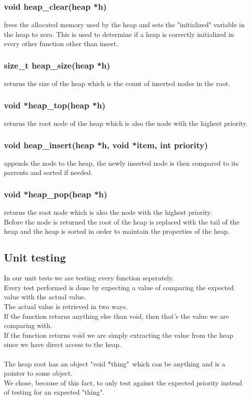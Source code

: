 \documentclass[a4paper,12pt,danish]{report}
\begin{document}
\subsubsection{void heap\_clear(heap *h)}
frees the allocated memory used by the heap and sets the "initialized" variable in the heap to zero. This is used to determine if a heap is correctly initialized in every other function other than insert.

\subsubsection{size\_t heap\_size(heap *h)}
returns the size of the heap which is the count of inserted nodes in the root.

\subsubsection{void *heap\_top(heap *h)}
returns the root node of the heap which is also the node with the highest priority.

\subsubsection{void heap\_insert(heap *h, void *item, int priority)}
appends the node to the heap, the newly inserted node is then compared to its parrents and sorted if needed.

\subsubsection{void *heap\_pop(heap *h)}
returns the root node which is also the node with the highest priority.
\\
Before the node is returned the root of the heap is replaced with the tail of the heap and the heap is sorted in order to maintain the properties of the heap.
\subsection{Unit testing}
In our unit tests we are testing every function seperately.
\\
Every test performed is done by expecting a value of comparing the expected value with the actual value.
\\
The actual value is retrieved in two ways.
\\
If the function returns anything else than void, then that's the value we are comparing with.
\\
If the function returns void we are simply extracting the value from the heap since we have direct access to the heap.
\\
\\
The heap root has an object "void *thing"\ which can be anything and is a pointer to some object.
\\
We chose, because of this fact, to only test against the expected priority instead of testing for an expected "thing".
\\
\end{document}
